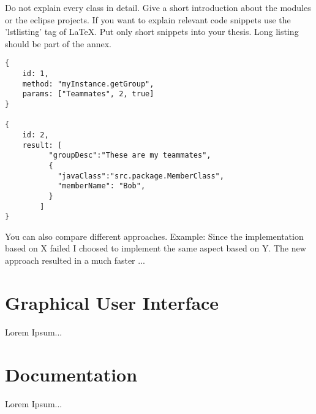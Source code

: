 Do not explain every class in detail. Give a short introduction about the modules or the eclipse projects. If you want to explain relevant code snippets use the 'lstlisting' tag of LaTeX. Put only short snippets into your thesis. Long listing should be part of the annex.

\lstset{caption=JSON String Code Snippet,label=jsonstring,showstringspaces=false}
\begin{lstlisting}
{
	id: 1,
	method: "myInstance.getGroup",
	params: ["Teammates", 2, true]
}

{
	id: 2,
	result: [
		  "groupDesc":"These are my teammates",
		  {
			"javaClass":"src.package.MemberClass",
			"memberName": "Bob",      
		  }
		]
}\end{lstlisting}

You can also compare different approaches. Example: Since the implementation based on X failed I choosed to implement the same aspect based on Y. The new approach resulted in a much faster ...

\section{Graphical User Interface\label{sec:gui}}

Lorem Ipsum...

\section{Documentation\label{sec:docu}}

Lorem Ipsum...


